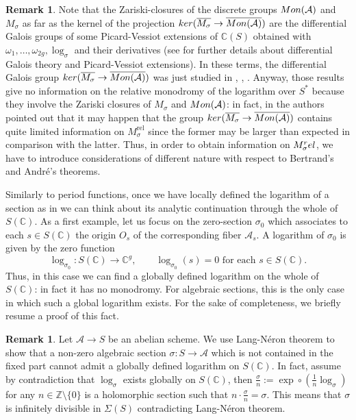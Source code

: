 \documentclass[10 pt,a4paper]{article}
\theoremstyle{plain}
\theoremstyle{definition}
\newtheorem{rem}[thm]{Remark}
\theoremstyle{named}
\newcommand{\cA}{\mathcal A}
\newcommand{\bC}{\mathbb C}
\newcommand{\bZ}{\mathbb Z}
\begin{document}
\begin{rem}
	Note that the Zariski-closures of the discrete groups $\textnormal{Mon}(\cA)$ and $M_\sigma$ as far as the kernel of the projection $\textrm{ker}(\overline{M_\sigma} \to \overline{\textnormal{Mon}(\cA)})$ are the differential Galois groups of some Picard-Vessiot extensions of $\bC(S)$ obtained with $\omega_1, \ldots, \omega_{2g}, \log_\sigma$ and their derivatives (see \cite{CH} for further details about differential Galois theory and Picard-Vessiot extensions). In these terms, the differential Galois group $\textrm{ker}(\overline{M_\sigma} \to \overline{\textnormal{Mon}(\cA)})$ was just studied in \cite{André}, \cite{André2}, \cite{Ber2}. Anyway, those results give no information on the relative monodromy of the logarithm over $S^*$ because they involve the Zariski closures of $M_{\sigma}$ and $\textnormal{Mon}(\cA)$: in fact, in \cite{CZ} the authors pointed out that it may happen that the group $\textrm{ker}(\overline{M_\sigma} \to \overline{\textnormal{Mon}(\cA)})$ contains quite limited information on $M_{\sigma}^\textrm{rel}$ since the former may be larger than expected in comparison with the latter. Thus, in order to obtain information on $M_\sigma^\textnormal{rel}$, we have to introduce considerations of different nature with respect to Bertrand's and André's theorems.
\end{rem}



Similarly to period functions, once we have locally defined the logarithm of a section as in  we can think about its analytic continuation through the whole of $S(\bC)$. As a first example, let us focus on the zero-section $\sigma_0$ which associates to each $s \in S(\bC)$ the origin $O_s$ of the corresponding fiber $\cA_s$. A logarithm of $\sigma_0$ is given by the zero function
\[
\log_{\sigma_0}:S(\bC) \rightarrow \bC^g, \qquad \log_{\sigma_0}(s)=0 \textrm{ for each } s \in S(\bC).
\]
Thus, in this case we can find a globally defined logarithm on the whole of $S(\bC)$: in fact it has no monodromy. For algebraic sections, this is the only case in which such a global logarithm exists. For the sake of completeness, we briefly resume a proof of this fact.

\begin{rem}\label{wellDefLog}
	Let $\cA \to S$ be an abelian scheme. We use Lang-Néron theorem \cite[Thorem 1]{LanNér} to show that a non-zero algebraic section $\sigma:S \rightarrow \cA$ which is not contained in the fixed part cannot admit a globally defined logarithm on $S(\bC)$. In fact, assume by contradiction that $\log_\sigma$ exists globally on $S(\bC)$, then $\frac{\sigma}{n}:= \exp \circ \left(\frac{1}{n}\log_\sigma\right)$ for any $n \in \bZ \setminus \{0\}$ is a holomorphic section such that $n \cdot \frac{\sigma}{n}=\sigma$. This means that $\sigma$ is infinitely divisible in $\Sigma(S)$ contradicting Lang-Néron theorem. 
\end{rem}
\end{document}

